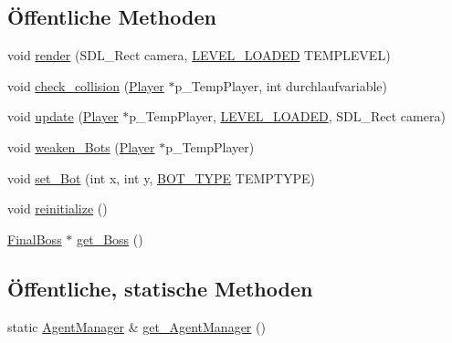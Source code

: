 \subsection*{Öffentliche Methoden}
\begin{DoxyCompactItemize}
\item 
void \hyperlink{class_agent_manager_a1b94eb002a1a9a57106539b84402f32a}{render} (S\-D\-L\-\_\-\-Rect camera, \hyperlink{globals_8h_a3951bd57665e2e4c8a4411c2a5477207}{L\-E\-V\-E\-L\-\_\-\-L\-O\-A\-D\-E\-D} T\-E\-M\-P\-L\-E\-V\-E\-L)
\item 
void \hyperlink{class_agent_manager_a5548da9e3f247e8dd4a9eb98748fd3df}{check\-\_\-collision} (\hyperlink{class_player}{Player} $\ast$p\-\_\-\-Temp\-Player, int durchlaufvariable)
\item 
void \hyperlink{class_agent_manager_a1c05e1578aafde1892a5e4e79862b19f}{update} (\hyperlink{class_player}{Player} $\ast$p\-\_\-\-Temp\-Player, \hyperlink{globals_8h_a3951bd57665e2e4c8a4411c2a5477207}{L\-E\-V\-E\-L\-\_\-\-L\-O\-A\-D\-E\-D}, S\-D\-L\-\_\-\-Rect camera)
\item 
void \hyperlink{class_agent_manager_aafa2ae19bfa65b44dc3c955bd21e0fc3}{weaken\-\_\-\-Bots} (\hyperlink{class_player}{Player} $\ast$p\-\_\-\-Temp\-Player)
\item 
void \hyperlink{class_agent_manager_ab00a9cbf5753546fbb5f9f5cfa1b1241}{set\-\_\-\-Bot} (int x, int y, \hyperlink{globals_8h_aaf436d1bc29db707b62c299461f32ee7}{B\-O\-T\-\_\-\-T\-Y\-P\-E} T\-E\-M\-P\-T\-Y\-P\-E)
\item 
void \hyperlink{class_agent_manager_abc1499700649f6af77205fedc0698085}{reinitialize} ()
\item 
\hyperlink{class_final_boss}{Final\-Boss} $\ast$ \hyperlink{class_agent_manager_a13afeaa1a5581415e3b312444bb43b82}{get\-\_\-\-Boss} ()
\end{DoxyCompactItemize}
\subsection*{Öffentliche, statische Methoden}
\begin{DoxyCompactItemize}
\item 
static \hyperlink{class_agent_manager}{Agent\-Manager} \& \hyperlink{class_agent_manager_a1af0e6f1ed0b2b4db25617f4e9357e81}{get\-\_\-\-Agent\-Manager} ()
\end{DoxyCompactItemize}


